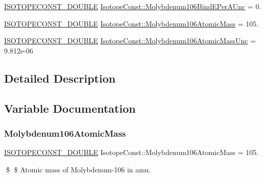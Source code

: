\begin{DoxyCompactItemize}
\mbox{\hyperlink{group___isotope_const-_macros_ga8f45a7272ce02c0b4c65c44636ed719a}{I\+S\+O\+T\+O\+P\+E\+C\+O\+N\+S\+T\+\_\+\+D\+O\+U\+B\+LE}} \mbox{\hyperlink{group___isotope_const-_molybdenum-_mo106_gaf387198ad32107542f5d04e9985bac4a}{Isotope\+Const\+::\+Molybdenum106\+Bind\+E\+Per\+A\+Unc}} = 0.
\item 
\mbox{\hyperlink{group___isotope_const-_macros_ga8f45a7272ce02c0b4c65c44636ed719a}{I\+S\+O\+T\+O\+P\+E\+C\+O\+N\+S\+T\+\_\+\+D\+O\+U\+B\+LE}} \mbox{\hyperlink{group___isotope_const-_molybdenum-_mo106_ga43a14f79ab8dbca6ac92f66f77fae5d4}{Isotope\+Const\+::\+Molybdenum106\+Atomic\+Mass}} = 105.
\item 
\mbox{\hyperlink{group___isotope_const-_macros_ga8f45a7272ce02c0b4c65c44636ed719a}{I\+S\+O\+T\+O\+P\+E\+C\+O\+N\+S\+T\+\_\+\+D\+O\+U\+B\+LE}} \mbox{\hyperlink{group___isotope_const-_molybdenum-_mo106_ga650f5010ed4568378ce71be2a83d79c2}{Isotope\+Const\+::\+Molybdenum106\+Atomic\+Mass\+Unc}} = 9.\+812e-\/06
\end{DoxyCompactItemize}


\subsection{Detailed Description}


\subsection{Variable Documentation}
\mbox{\label{group___isotope_const-_molybdenum-_mo106_ga43a14f79ab8dbca6ac92f66f77fae5d4}} 
\subsubsection{\texorpdfstring{Molybdenum106\+Atomic\+Mass}{Molybdenum106AtomicMass}}
{\footnotesize\ttfamily \mbox{\hyperlink{group___isotope_const-_macros_ga8f45a7272ce02c0b4c65c44636ed719a}{I\+S\+O\+T\+O\+P\+E\+C\+O\+N\+S\+T\+\_\+\+D\+O\+U\+B\+LE}} Isotope\+Const\+::\+Molybdenum106\+Atomic\+Mass = 105.}

\$ \$ Atomic mass of Molybdenum-\/106 in amu. \mbox{\label{group___isotope_const-_molybdenum-_mo106_ga650f5010ed4568378ce71be2a83d79c2}} 
